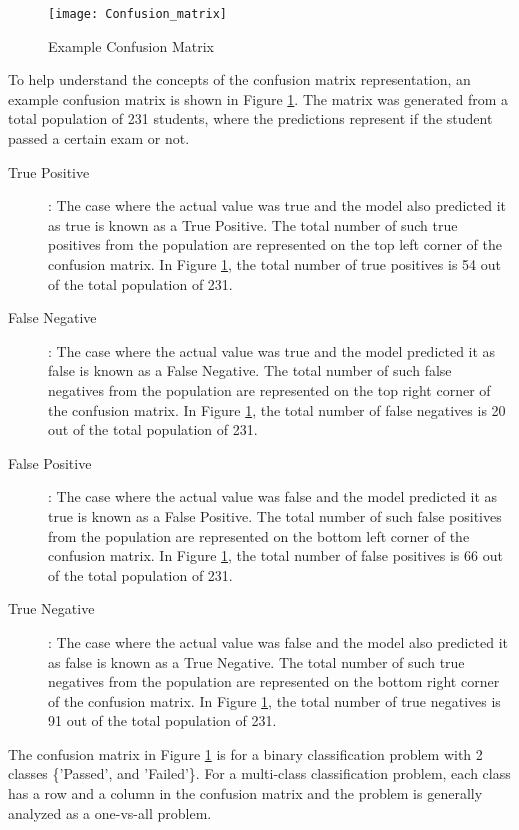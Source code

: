 \documentclass[11pt,openright]{report}
\begin{document}
  \begin{figure}[!htbp]
	\centering
	\texttt{[image: Confusion\_matrix]}
	\caption{Example Confusion Matrix}
	\label{fig:example_confusion_matrix}
\end{figure} 

To help understand the concepts of the confusion matrix representation, an example confusion matrix is shown in Figure \ref{fig:example_confusion_matrix}. The matrix was generated from a total population of 231 students, where the predictions represent if the student passed a certain exam or not. 
\begin{description}
    \item[True Positive] : The case where the actual value was true and the model also predicted it as true is known as a True Positive. The total number of such true positives from the population are represented on the top left corner of the confusion matrix. In Figure \ref{fig:example_confusion_matrix}, the total number of true positives is 54 out of the total population of 231.

    \item[False Negative] : The case where the actual value was true and the model predicted it as false is known as a False Negative. The total number of such false negatives from the population are represented on the top right corner of the confusion matrix. In Figure \ref{fig:example_confusion_matrix}, the total number of false negatives is 20 out of the total population of 231.

     \item[False Positive] : The case where the actual value was false and the model predicted it as true is known as a False Positive. The total number of such false positives from the population are represented on the bottom left corner of the confusion matrix. In Figure \ref{fig:example_confusion_matrix}, the total number of false positives is 66 out of the total population of 231.
     
      \item[True Negative] : The case where the actual value was false and the model also predicted it as false is known as a True Negative. The total number of such true negatives from the population are represented on the bottom right corner of the confusion matrix. In Figure \ref{fig:example_confusion_matrix}, the total number of true negatives is 91 out of the total population of 231.
     
 \end{description}
 The confusion matrix in Figure \ref{fig:example_confusion_matrix} is for a binary classification problem with 2 classes \{'Passed', and 'Failed'\}. For a multi-class classification problem, each class has a row and a column in the confusion matrix and the problem is generally analyzed as a one-vs-all problem.
\end{document}
